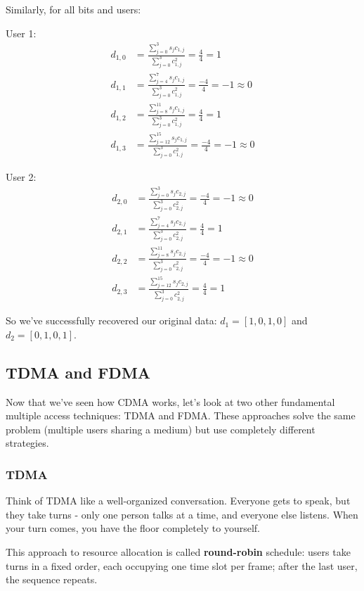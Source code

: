 Similarly, for all bits and users:

User 1:
\begin{align*}
d_{1,0} &= \frac{\sum_{j=0}^{3} s_j c_{1,j}}{\sum_{j=0}^{3} c_{1,j}^2} = \frac{4}{4} = 1 \\
d_{1,1} &= \frac{\sum_{j=4}^{7} s_j c_{1,j}}{\sum_{j=0}^{3} c_{1,j}^2} = \frac{-4}{4} = -1 \approx 0 \\
d_{1,2} &= \frac{\sum_{j=8}^{11} s_j c_{1,j}}{\sum_{j=0}^{3} c_{1,j}^2} = \frac{4}{4} = 1 \\
d_{1,3} &= \frac{\sum_{j=12}^{15} s_j c_{1,j}}{\sum_{j=0}^{3} c_{1,j}^2} = \frac{-4}{4} = -1 \approx 0
\end{align*}

User 2:
\begin{align*}
d_{2,0} &= \frac{\sum_{j=0}^{3} s_j c_{2,j}}{\sum_{j=0}^{3} c_{2,j}^2} = \frac{-4}{4} = -1 \approx 0 \\
d_{2,1} &= \frac{\sum_{j=4}^{7} s_j c_{2,j}}{\sum_{j=0}^{3} c_{2,j}^2} = \frac{4}{4} = 1 \\
d_{2,2} &= \frac{\sum_{j=8}^{11} s_j c_{2,j}}{\sum_{j=0}^{3} c_{2,j}^2} = \frac{-4}{4} = -1 \approx 0 \\
d_{2,3} &= \frac{\sum_{j=12}^{15} s_j c_{2,j}}{\sum_{j=0}^{3} c_{2,j}^2} = \frac{4}{4} = 1
\end{align*}

So we've successfully recovered our original data: $d_1 = [1, 0, 1, 0]$ and $d_2 = [0, 1, 0, 1]$.

\newpage
\subsection{TDMA and FDMA}
\label{subsec:tdma_fdma}

Now that we've seen how CDMA works, let's look at two other fundamental multiple access techniques: TDMA and FDMA. These approaches solve the same problem (multiple users sharing a medium) but use completely different strategies.

\subsubsection{TDMA}
Think of TDMA like a well-organized conversation. Everyone gets to speak, but they take turns - only one person talks at a time, and everyone else listens. When your turn comes, you have the floor completely to yourself.

This approach to resource allocation is called \textbf{round-robin} schedule: users take turns in a fixed order, each occupying one time slot per frame; after the last user, the sequence repeats.

